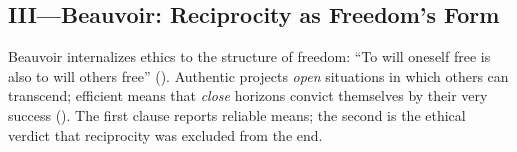 \subsection*{III—Beauvoir: Reciprocity as Freedom’s Form}
\label{ssec:iii-beauvoir}
Beauvoir internalizes ethics to the structure of freedom: “To will oneself free is also to will others free” (\parencite[p.~73]{Beauvoir1976}). Authentic projects \emph{open} situations in which others can transcend; efficient means that \emph{close} horizons convict themselves by their very success (\parencite[pp.~134--147, 157--161, 164--173]{Beauvoir1976}). The first clause reports reliable means; the second is the ethical verdict that reciprocity was excluded from the end.
